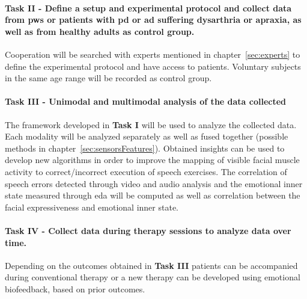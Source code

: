 \paragraph{Task II - Define a setup and experimental protocol and collect data from \gls{pws} or patients with \gls{pd} or \gls{ad} suffering \gls{dysarthria} or \gls{apraxia}, as well as from healthy adults as control group.}
Cooperation will be searched with experts mentioned in chapter~\ref{sec:experts} to define the experimental protocol and have access to patients. Voluntary subjects in the same age range will be recorded as control group.

\paragraph{Task III - Unimodal and multimodal analysis of the data collected} The framework developed in \textbf{Task I} will be used to analyze the collected data. Each modality will be analyzed separately as well as fused together (possible methods in chapter~\ref{sec:sensorsFeatures}). Obtained insights can be used to develop new algorithms in order to improve the mapping of visible facial muscle activity to correct/incorrect execution of speech exercises. The correlation of speech errors detected through video and audio analysis and the emotional inner state measured through \gls{eda} will be computed as well as correlation between the facial expressiveness and emotional inner state. 

\begin{comment}
\paragraph{Task IV - Analyze influence of emotional biofeedback in stutter therapy over time.} Existing therapy exercises will be combined with emotional biofeedback. Given the insights from \textbf{Task IIb}, the modalities which gather most information will be used to collect data during several therapy sessions. As the collected data will represent the progress over time, a mathematical framework will be developed to represent the evolution over time. This representation can be used to develop a measurement of the benefit the therapy provides.
\end{comment}

\paragraph{Task IV - Collect data during therapy sessions to analyze data over time.} Depending on the outcomes obtained in \textbf{Task III} patients can be accompanied during conventional therapy or a new therapy can be developed using emotional biofeedback, based on prior outcomes.

